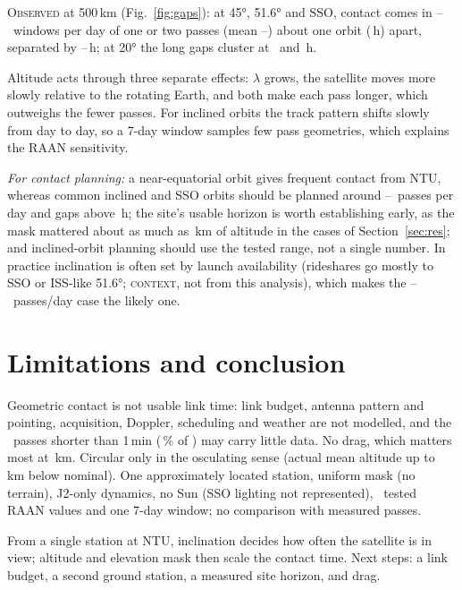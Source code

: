 \documentclass[11pt]{article}
\newcommand{\lbl}[1]{\textsc{#1}}
\begin{document}
\lbl{Observed} at 500\,km (Fig.~\ref{fig:gaps}): at 45°, 51.6° and SSO, contact comes in \WinPerDayMin--\WinPerDayMax\ windows per day of one or two passes (mean \PassPerWinMin--\PassPerWinMax) about one orbit (\GapShortMed\,h) apart, separated by \GapLongMin--\GapLongMax\,h; at 20° the long gaps cluster at \TwGapA\ and \TwGapB\,h.

Altitude acts through three separate effects: $\lambda$ grows, the satellite moves more slowly relative to the rotating Earth, and both make each pass longer, which outweighs the fewer passes. For inclined orbits the track pattern shifts slowly from day to day, so a 7-day window samples few pass geometries, which explains the RAAN sensitivity.

\emph{For contact planning:} a near-equatorial orbit gives frequent contact from NTU, whereas common inclined and SSO orbits should be planned around \HiPLoInt--\HiPHiInt\ passes per day and gaps above \HiGFloor\,h; the site's usable horizon is worth establishing early, as the mask mattered about as much as \MaskAltDiff\,km of altitude in the cases of Section~\ref{sec:res}; and inclined-orbit planning should use the tested range, not a single number. In practice inclination is often set by launch availability (rideshares go mostly to SSO or ISS-like 51.6°; \lbl{context}, not from this analysis), which makes the \HiPLoInt--\HiPHiInt\ passes/day case the likely one.

\section{Limitations and conclusion}\label{sec:lim}
Geometric contact is not usable link time: link budget, antenna pattern and pointing, acquisition, Doppler, scheduling and weather are not modelled, and the \NShort\ passes shorter than 1\,min (\ShortPct\,\% of \NPassesTotal) may carry little data. No drag, which matters most at \HLo\,km. Circular only in the osculating sense (actual mean altitude up to \MaxAltOffset\,km below nominal). One approximately located station, uniform mask (no terrain), J2-only dynamics, no Sun (SSO lighting not represented), \NRaan\ tested RAAN values and one 7-day window; no comparison with measured passes.

From a single station at NTU, inclination decides how often the satellite is in view; altitude and elevation mask then scale the contact time. Next steps: a link budget, a second ground station, a measured site horizon, and drag.

\label{body-end}
\clearpage
\appendix
\renewcommand{\thesection}{\Alph{section}}
\end{document}
